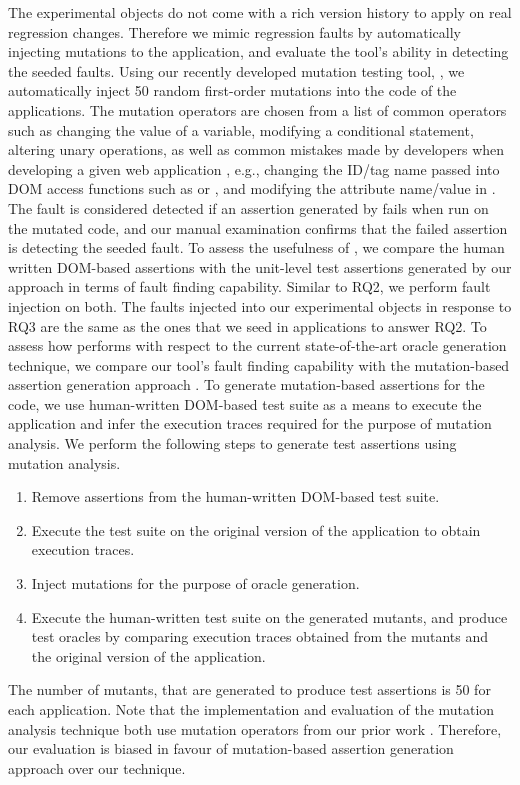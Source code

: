 The experimental objects do not come with a rich version history to apply \atrina on real regression changes. Therefore we mimic regression faults by automatically injecting mutations to the application, and evaluate the tool's ability in detecting the seeded faults. Using our recently developed mutation testing tool, \mutandis \cite{mirshokraie:icst13}, we automatically inject 50 random first-order mutations into the \javascript code of the applications. The mutation operators are chosen from a list of common operators such as changing the value of a variable, modifying a conditional statement, altering unary operations, as well as common mistakes made by developers when developing a given web application \cite{mirshokraie:tse15}, e.g., changing the ID/tag name passed into DOM access functions such as  or , and modifying the attribute name/value in . The fault is considered detected if an assertion generated by \atrina fails when run on the mutated code, and our manual examination confirms that the failed assertion is detecting the seeded fault.
 To assess the usefulness of \atrina, we compare the human written DOM-based assertions with the unit-level test assertions generated by our approach in terms of fault finding capability.
Similar to RQ2, we perform fault injection on both.
The faults injected into our experimental objects in response to RQ3 are the same as the ones that we seed in applications to answer RQ2.
 To assess how \atrina performs with respect to the current state-of-the-art oracle generation technique, we compare our tool's fault finding capability with the mutation-based assertion generation approach \cite{mirshokraie:icst15, fraser:tse12}. To generate mutation-based assertions for the \javascript code, we use human-written DOM-based test suite as a means to execute the application and infer the execution traces required for the purpose of mutation analysis. We perform the following steps to generate test assertions using mutation analysis.
\begin{enumerate}
\item Remove assertions from the human-written DOM-based test suite.
\item Execute the test suite on the original version of the application to obtain execution traces.
\item Inject mutations for the purpose of oracle generation.
\item Execute the human-written test suite on the generated mutants, and produce test oracles by comparing execution traces obtained from the mutants and the original version of the application.
\end{enumerate}
The number of mutants, that are generated to produce test assertions is 50 for each application. Note that the implementation and evaluation of the mutation analysis technique both use mutation operators from our prior work \cite{mirshokraie:tse15}. Therefore, our evaluation is biased in favour of mutation-based assertion generation approach over our technique.


% 

